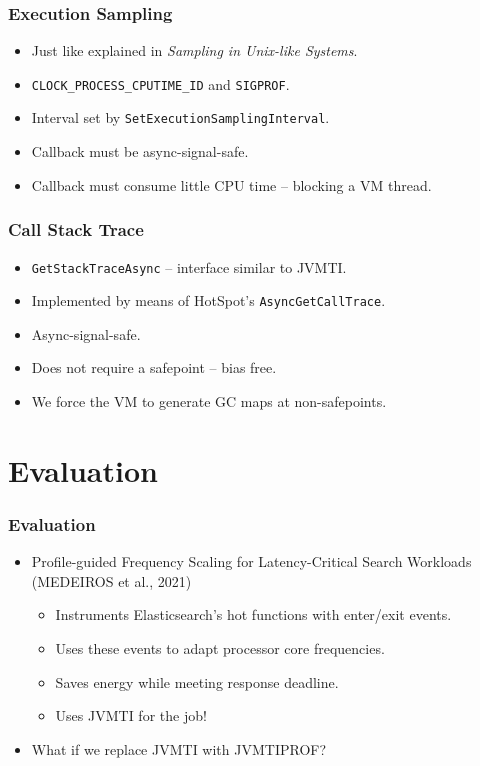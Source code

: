 \documentclass{beamer}
\begin{document}
\begin{frame}
\frametitle{Execution Sampling}
\begin{itemize}
\item Just like explained in \emph{Sampling in Unix-like Systems}.
\item \lstinline{CLOCK_PROCESS_CPUTIME_ID} and \lstinline{SIGPROF}.
\item Interval set by \lstinline{SetExecutionSamplingInterval}.
\item Callback must be async-signal-safe.
\item Callback must consume little CPU time -- blocking a VM thread.
\end{itemize}
\end{frame}

\begin{frame}
\frametitle{Call Stack Trace}
\begin{itemize}
\item \lstinline{GetStackTraceAsync} -- interface similar to JVMTI.
\item Implemented by means of HotSpot's \lstinline{AsyncGetCallTrace}.
\item Async-signal-safe.
\item Does not require a safepoint -- bias free.
\item We force the VM to generate GC maps at non-safepoints.
\end{itemize}
\end{frame}

\section{Evaluation}

\begin{frame}
\frametitle{Evaluation}
\begin{itemize}
\item Profile-guided Frequency Scaling for Latency-Critical Search Workloads (MEDEIROS et al., 2021)
\begin{itemize}
\item Instruments Elasticsearch's hot functions with enter/exit events.
\item Uses these events to adapt processor core frequencies.
\item Saves energy while meeting response deadline. %
\item Uses JVMTI for the job!
\end{itemize}
\item What if we replace JVMTI with JVMTIPROF?
\end{itemize}
\end{frame}
\end{document}
